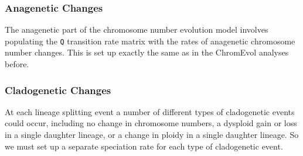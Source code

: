 \subsubsection{Anagenetic Changes}

The anagenetic part of the chromosome number evolution model involves populating the \texttt{Q} transition rate matrix with the rates of anagenetic chromosome number changes.
This is set up exactly the same as in the ChromEvol analyses before.

\subsubsection{Cladogenetic Changes}

At each lineage splitting event a number of different types of cladogenetic events could occur, including no change in chromosome numbers, a dysploid gain or loss in a single daughter lineage, or a change in ploidy in a single daughter lineage.
So we must set up a separate speciation rate for each type of cladogenetic event.

